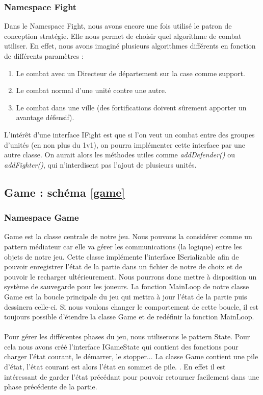 		\subsubsection{Namespace Fight}
			Dans le Namespace Fight, nous avons encore une fois utilisé le patron de conception stratégie.
			Elle nous permet de choisir quel algorithme de combat utiliser.
			En effet, nous avons imaginé plusieurs algorithmes différents en fonction de différents paramètres :
			\begin{enumerate}
				\item Le combat avec un Directeur de département sur la case comme support.
				\item Le combat normal d'une unité contre une autre.
				\item Le combat dans une ville (des fortifications doivent sûrement apporter un avantage défensif).
			\end{enumerate}
			L'intérêt d'une interface IFight est que si l'on veut un combat entre des groupes d'unités (en non plus du 1v1), on pourra implémenter cette interface par une autre classe.
			On aurait alors les méthodes utiles comme \textit{addDefender()} ou \textit{addFighter()}, qui n'interdisent pas l'ajout de plusieurs unités.
		
	\subsection{Game : schéma \ref{game}}	
		\subsubsection{Namespace Game}
				Game est la classe centrale de notre jeu. 
				Nous pouvons la considérer comme un pattern médiateur car elle va gérer les communications (la logique) entre les objets de notre jeu.
			Cette classe implémente l'interface ISerializable afin de pouvoir enregistrer l'état de la partie dans un fichier de notre de choix et de pouvoir le recharger ultérieurement. Nous pourrons donc mettre à disposition un système de sauvegarde pour les joueurs. 
			La fonction MainLoop de notre classe Game est la boucle principale du jeu qui mettra à jour l'état de la partie puis dessinera celle-ci. 
			Si nous voulons changer le comportement de cette boucle, il est toujours possible d'étendre la classe Game et de redéfinir la fonction MainLoop.
				\paragraph{}
				Pour gérer les différentes phases du jeu, nous utiliserons le pattern State. 
			Pour cela nous avons créé l'interface IGameState qui contient des fonctions pour charger l'état courant, le démarrer, le stopper...
			La classe Game contient une pile d'état, l'état courant est alors l'état en sommet de pile. .
			En effet il est intéressant de garder l'état précédant pour pouvoir retourner facilement dans une phase précédente de la partie.

